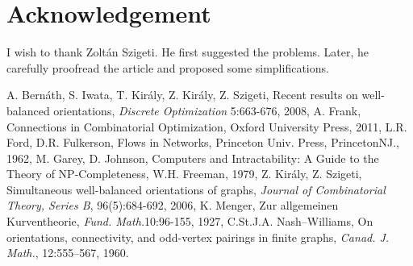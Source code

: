 \documentclass[a4paper,12pt,makeidx]{article}
\begin{document}
\section*{Acknowledgement}
I wish to thank Zolt\'an Szigeti. He first suggested the problems. Later, he carefully proofread the article and proposed some simplifications.
\begin{thebibliography}{99}
 A. Bernáth, S. Iwata, T. Király, Z. Király, Z. Szigeti, Recent results on well-balanced orientations, \textit {Discrete Optimization} 5:663-676, 2008,
 A. Frank, Connections in Combinatorial Optimization, Oxford University Press, 2011,
 L.R. Ford, D.R. Fulkerson, Flows in Networks, Princeton Univ. Press, PrincetonNJ., 1962,
 M. Garey, D. Johnson, Computers and Intractability: A Guide to the Theory of NP-Completeness, W.H. Freeman, 1979,
 Z. Kir\'aly, Z. Szigeti, Simultaneous well-balanced orientations of graphs, \textit{Journal of Combinatorial Theory, Series B}, 96(5):684-692, 2006,
 K. Menger, Zur allgemeinen Kurventheorie, \textit{Fund. Math.}10:96-155, 1927,
 C.St.J.A. Nash--Williams, On orientations, connectivity, and odd-vertex pairings in finite graphs, \textit{Canad. J. Math.}, 12:555--567, 1960.


\end{thebibliography}
\end{document}
